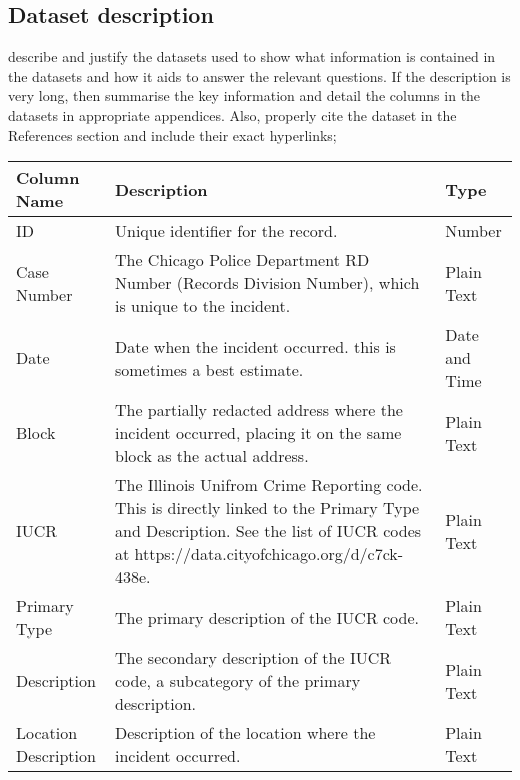 
\subsection{Dataset description}\label{subsection}
describe and justify the datasets used to show what information is contained in the datasets and how it aids to answer the relevant questions. If the description is very long, then summarise the key information and detail the columns in the datasets in appropriate appendices. Also, properly cite the dataset in the References section and include their exact hyperlinks; \newline


\begin{center}
    \begin{longtable}{|m{6em}|m{18em}|m{7em}|}
        \hline
            Column Name & 
            Description & 
            Type\\
        \hline
            ID & 
            Unique identifier for the record. & 
            Number\\
        \hline
            Case Number & 
            The Chicago Police Department RD Number (Records Division Number),
            which is unique to the incident. & 
            Plain Text\\
        \hline
            Date & 
            Date when the incident occurred. this is sometimes a best estimate. & 
            Date and Time\\
        \hline
            Block & 
            The partially redacted address where the incident occurred, 
            placing it on the same block as the actual address. & 
            Plain Text\\
        \hline
            IUCR & 
            The Illinois Unifrom Crime Reporting code. This is directly linked 
            to the Primary Type and Description. See the list of IUCR codes 
            at https://data.cityofchicago.org/d/c7ck-438e. & 
            Plain Text\\
        \hline
            Primary Type & 
            The primary description of the IUCR code. & 
            Plain Text\\
        \hline
            Description & 
            The secondary description of the IUCR code, 
            a subcategory of the primary description. & 
            Plain Text\\
        \hline
            Location Description & 
            Description of the location where the incident occurred. & 
            Plain Text\\

\end{longtable}
\end{center}
